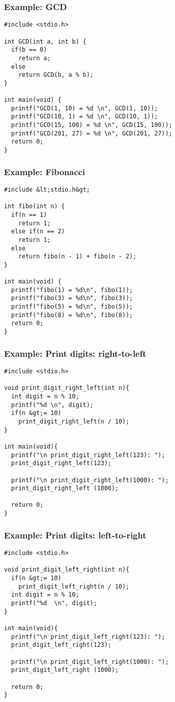 \documentclass{../c-lecture}
\begin{document}
\begin{frame}
  \frametitle{Example: GCD}
  \begin{verbatim}
#include <stdio.h>

int GCD(int a, int b) {
  if(b == 0)
    return a;
  else
    return GCD(b, a % b);
}

int main(void) {
  printf("GCD(1, 10) = %d \n", GCD(1, 10));
  printf("GCD(10, 1) = %d \n", GCD(10, 1));
  printf("GCD(15, 100) = %d \n", GCD(15, 100));
  printf("GCD(201, 27) = %d \n", GCD(201, 27));
  return 0;
}
  \end{verbatim}
\end{frame}

\begin{frame}[fragile]
  \frametitle{Example: Fibonacci}
  \begin{verbatim}
#include &lt;stdio.h&gt;

int fibo(int n) {
  if(n == 1)
    return 1;
  else if(n == 2)
    return 1;
  else
    return fibo(n - 1) + fibo(n - 2);
}

int main(void) {
  printf("fibo(1) = %d\n", fibo(1));
  printf("fibo(3) = %d\n", fibo(3));
  printf("fibo(5) = %d\n", fibo(5));
  printf("fibo(8) = %d\n", fibo(8));
  return 0;
}
  \end{verbatim}
\end{frame}

\begin{frame}[fragile]
  \frametitle{Example: Print digits: right-to-left}
  \begin{verbatim}
#include <stdio.h>

void print_digit_right_left(int n){
  int digit = n % 10;
  printf("%d \n", digit);
  if(n &gt;= 10)
    print_digit_right_left(n / 10);
}

int main(void){
  printf("\n print_digit_right_left(123): ");
  print_digit_right_left(123);

  printf("\n print_digit_right_left(1000): ");
  print_digit_right_left (1000);

  return 0;
}
  \end{verbatim}
\end{frame}

\begin{frame}[fragile]
  \frametitle{Example: Print digits: left-to-right}
  \begin{verbatim}
#include <stdio.h>

void print_digit_left_right(int n){
  if(n &gt;= 10)
    print_digit_left_right(n / 10);
  int digit = n % 10;
  printf("%d  \n", digit);
}

int main(void){
  printf("\n print_digit_left_right(123): ");
  print_digit_left_right(123);

  printf("\n print_digit_left_right(1000): ");
  print_digit_left_right (1000);

  return 0;
}
  \end{verbatim}
\end{frame}
\end{document}
